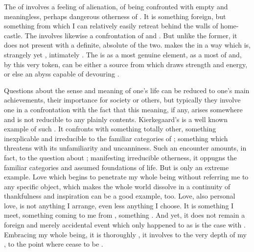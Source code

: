 The  of  involves a feeling of
alienation, of being confronted with empty and meaningless, perhaps dangerous
otherness of .  It is something foreign, but something from which I
can relatively easily retreat behind the walls of  home-castle.  The
 involves likewise a confrontation of  and
.  But unlike the former, it does not present  with
a definite, absolute  of the two.  
makes the   in a way which is, strangely yet
, intimately .  The  is  as a most
genuine element, as a most  of  and, by this very
token, can be either a source from which  draws strength and
energy, or else an abyss capable of devouring .

Questions about the sense and meaning of one's life can be reduced to one's main
achievements, their importance for society or others, but typically they involve
one in a confrontation with the fact that this meaning, if any, arises somewhere
 and is not reducible to any plainly  contents.
Kierkegaard's  is a well known example of such .  It
confronts  with something totally other, something inexplicable and
irreducible to the familiar categories of ; something which
threatens  with its unfamiliarity and uncanniness. Such an encounter
amounts, in fact, to the question about ; manifesting irreducible
otherness, it oppugns the familiar categories and assumed foundations of 
life.  But  is only an extreme example.  Love which begins to
penetrate my whole being without referring me to any specific object, which makes
the whole world dissolve in a continuity of thankfulness and inspiration can be
a good example, too.  Love, also personal love, is not anything I arrange, even
less anything I choose.  It is something I meet, something coming to me from
, something . And yet, it does not remain a foreign and
merely accidental event which only happened to  as is the case with
. Embracing my whole being, it is thoroughly ,
it involves  to the very depth of my , to the point where
 cease to be .

